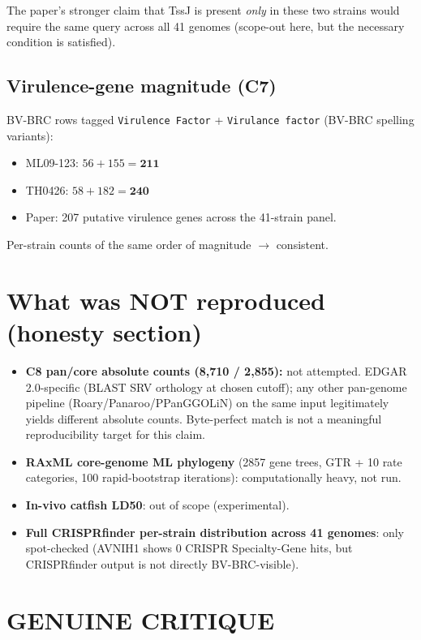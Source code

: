 \documentclass[11pt]{article}
\begin{document}
The paper's stronger claim that TssJ is present \emph{only} in these two
strains would require the same query across all 41 genomes (scope-out here,
but the necessary condition is satisfied). \checkmark

\subsection{Virulence-gene magnitude (C7)}
BV-BRC rows tagged \texttt{Virulence Factor} + \texttt{Virulance factor}
(BV-BRC spelling variants):
\begin{itemize}
  \item ML09-123: $56 + 155 = \mathbf{211}$
  \item TH0426:   $58 + 182 = \mathbf{240}$
  \item Paper: 207 putative virulence genes across the 41-strain panel.
\end{itemize}

Per-strain counts of the same order of magnitude $\rightarrow$ consistent. \checkmark

\section{What was NOT reproduced (honesty section)}
\begin{itemize}
  \item \textbf{C8 pan/core absolute counts (8{,}710 / 2{,}855):} not
        attempted. EDGAR 2.0-specific (BLAST SRV orthology at chosen cutoff);
        any other pan-genome pipeline (Roary/Panaroo/PPanGGOLiN) on the same
        input legitimately yields different absolute counts. Byte-perfect
        match is not a meaningful reproducibility target for this claim.
  \item \textbf{RAxML core-genome ML phylogeny} (2857 gene trees, GTR + 10
        rate categories, 100 rapid-bootstrap iterations): computationally
        heavy, not run.
  \item \textbf{In-vivo catfish LD50}: out of scope (experimental).
  \item \textbf{Full CRISPRfinder per-strain distribution across 41 genomes}:
        only spot-checked (AVNIH1 shows 0 CRISPR Specialty-Gene hits, but
        CRISPRfinder output is not directly BV-BRC-visible).
\end{itemize}

\section{GENUINE CRITIQUE}
\end{document}
